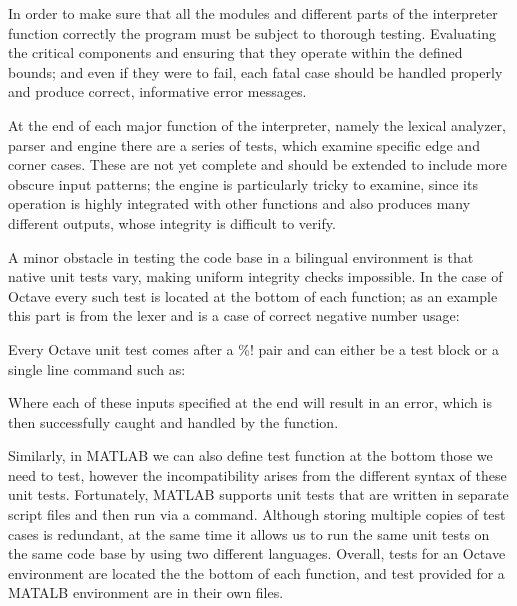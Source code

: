 
In order to make sure that all the modules and different parts of the interpreter function correctly the program must be subject to thorough testing. Evaluating the critical components and ensuring that they operate within the defined bounds; and even if they were to fail, each fatal case should be handled properly and produce correct, informative error messages.

At the end of each major function of the interpreter, namely the lexical analyzer, parser and engine there are a series of tests, which examine specific edge and corner cases. These are not yet complete and should be extended to include more obscure input patterns; the engine is particularly tricky to examine, since its operation is highly integrated with other functions and also produces many different outputs, whose integrity is difficult to verify.

A minor obstacle in testing the code base in a bilingual environment is that native unit tests vary, making uniform integrity checks impossible. In the case of Octave every such test is located at the bottom of each function; as an example this part is from the lexer and is a case of correct negative number usage:

\begin{octave}
\end{octave}

Every Octave unit test comes after a \%! pair and can either be a test block or a single line command such as:

\begin{octave}
\end{octave}

Where each of these inputs specified at the end will result in an error, which is then successfully caught and handled by the function.

Similarly, in MATLAB we can also define test function at the bottom those we need to test, however the incompatibility arises from the different syntax of these unit tests. Fortunately, MATLAB supports unit tests that are written in separate script files and then run via a command. Although storing multiple copies of test cases is redundant, at the same time it allows us to run the same unit tests on the same code base by using two different languages. Overall, tests for an Octave environment are located the the bottom of each function, and test provided for a MATALB environment are in their own files.

